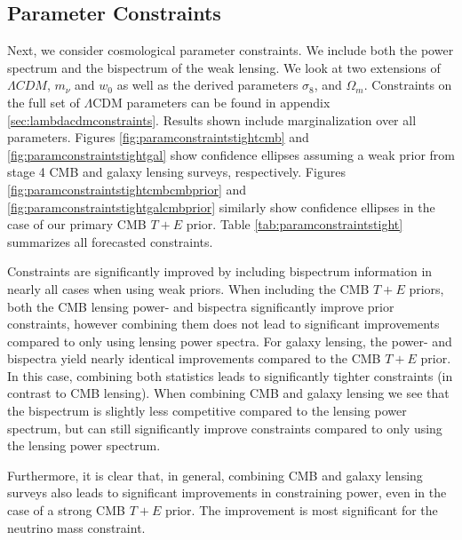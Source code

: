 \documentclass[11pt]{article} %
\begin{document}
\subsection{Parameter Constraints}
Next, we consider cosmological parameter constraints. We include both the power spectrum and the bispectrum of the weak lensing. We look at two extensions of $\Lambda CDM$, $m_\nu$ and $w_0$ as well as the derived parameters $\sigma_8$, and $\Omega_m$. Constraints on the full set of $\Lambda$CDM parameters can be found in appendix \ref{sec:lambdacdmconstraints}. Results shown include marginalization over all parameters. Figures \ref{fig:paramconstraintstightcmb} and \ref{fig:paramconstraintstightgal} show confidence ellipses assuming a weak prior from stage 4 CMB and galaxy lensing surveys, respectively. Figures \ref{fig:paramconstraintstightcmbcmbprior} and \ref{fig:paramconstraintstightgalcmbprior} similarly show confidence ellipses in the case of our primary CMB $T+E$ prior. Table \ref{tab:paramconstraintstight} summarizes all forecasted constraints. 

Constraints are significantly improved by including bispectrum information in nearly all cases when using weak priors. When including the CMB $T+E$ priors, both the CMB lensing power- and bispectra significantly improve prior constraints, however combining them does not lead to significant improvements compared to only using lensing power spectra. For galaxy lensing, the power- and bispectra yield nearly identical improvements compared to the CMB $T+E$ prior. In this case, combining both statistics leads to significantly tighter constraints (in contrast to CMB lensing). When combining CMB and galaxy lensing we see that the bispectrum is slightly less competitive compared to the lensing power spectrum, but can still significantly improve constraints compared to only using the lensing power spectrum.

Furthermore, it is clear that, in general, combining CMB and galaxy lensing surveys also leads to significant improvements in constraining power, even in the case of a strong CMB $T+E$ prior. The improvement is most significant for the neutrino mass constraint.
\end{document}

